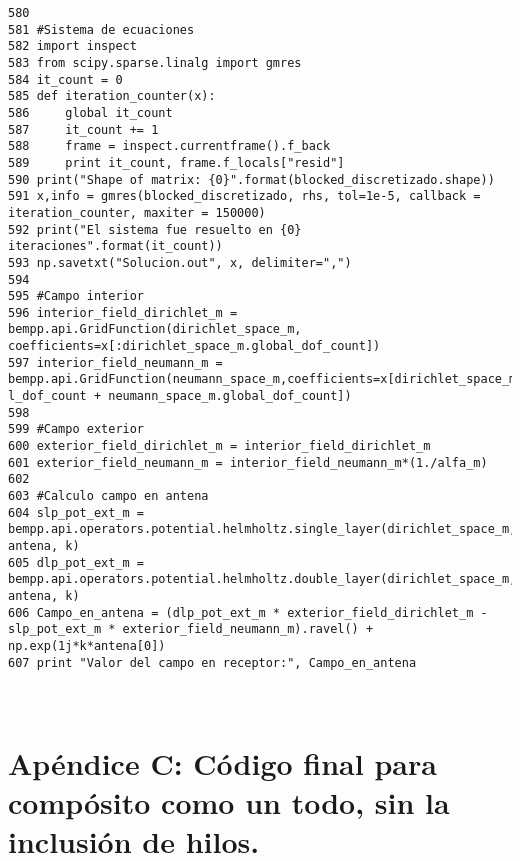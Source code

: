 \documentclass[12pt,letterpaper]{article}
\numberwithin{equation}{section}
\begin{document}
\begin{lstlisting}
580 
581 #Sistema de ecuaciones
582 import inspect
583 from scipy.sparse.linalg import gmres
584 it_count = 0
585 def iteration_counter(x):
586     global it_count
587     it_count += 1
588     frame = inspect.currentframe().f_back
589     print it_count, frame.f_locals["resid"]
590 print("Shape of matrix: {0}".format(blocked_discretizado.shape))
591 x,info = gmres(blocked_discretizado, rhs, tol=1e-5, callback = iteration_counter, maxiter = 150000)
592 print("El sistema fue resuelto en {0} iteraciones".format(it_count))
593 np.savetxt("Solucion.out", x, delimiter=",")
594 
595 #Campo interior
596 interior_field_dirichlet_m = bempp.api.GridFunction(dirichlet_space_m, coefficients=x[:dirichlet_space_m.global_dof_count])
597 interior_field_neumann_m = bempp.api.GridFunction(neumann_space_m,coefficients=x[dirichlet_space_m.global_dof_count:dirichlet_space_m.globa    l_dof_count + neumann_space_m.global_dof_count])
598 
599 #Campo exterior
600 exterior_field_dirichlet_m = interior_field_dirichlet_m
601 exterior_field_neumann_m = interior_field_neumann_m*(1./alfa_m)
602 
603 #Calculo campo en antena
604 slp_pot_ext_m = bempp.api.operators.potential.helmholtz.single_layer(dirichlet_space_m, antena, k)
605 dlp_pot_ext_m = bempp.api.operators.potential.helmholtz.double_layer(dirichlet_space_m, antena, k)
606 Campo_en_antena = (dlp_pot_ext_m * exterior_field_dirichlet_m - slp_pot_ext_m * exterior_field_neumann_m).ravel() + np.exp(1j*k*antena[0])
607 print "Valor del campo en receptor:", Campo_en_antena



\end{lstlisting}

\pagebreak

\part*{Apéndice C: Código final para compósito como un todo, sin la inclusión de hilos.}
\end{document}
